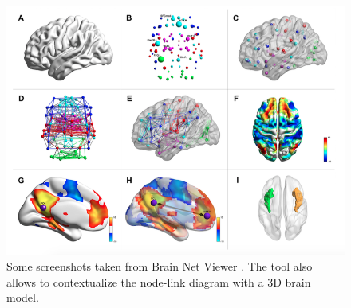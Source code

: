 \documentclass{article}
\begin{document}
\begin{multicols}{2}
\begin{figure}[ht]
\centerline{\includegraphics[width=1.9\columnwidth]{brain2}}
\caption{Some screenshots taken from Brain Net Viewer \cite{brainNetViewer}. The tool also allows to contextualize the node-link diagram with a 3D brain model.}
    \label{fig:brain2}
\end{figure}








\end{multicols}
\end{document}
